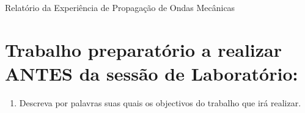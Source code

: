 \documentclass[a4paper,12pt]{article}  %
\author{Prof. Bernardo B. Carvalho}
\date{ Setembro 2017}
\begin{document}
 
{  \sf  Relatório da Experiência de Propagação de Ondas Mecânicas} %




\section{\sf Trabalho preparatório a realizar  ANTES da sessão de Laboratório:}
\begin{enumerate}
\item Descreva por palavras suas quais os objectivos do trabalho que irá realizar.

\end{enumerate}

\noindent\underline{\makebox[\textwidth][r]{~}} \\
\noindent\underline{\makebox[\textwidth][r]{~}} \\
\noindent\underline{\makebox[\textwidth][r]{~}} \\
\noindent\underline{\makebox[\textwidth][r]{~}} \\
\noindent\underline{\makebox[\textwidth][r]{~}} \\
\noindent\underline{\makebox[\textwidth][r]{~}} \\
\noindent\underline{\makebox[\textwidth][r]{~}} \\
\noindent\underline{\makebox[\textwidth][r]{~}} \\
\noindent\underline{\makebox[\textwidth][r]{~}} \\
\noindent\underline{\makebox[\textwidth][r]{~}} \\
\end{document}

